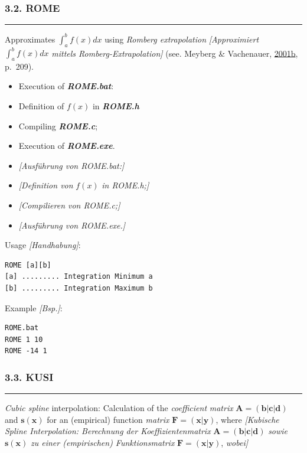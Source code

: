 \documentclass[
]{article}
\begin{document}
\hypertarget{rome}{%
\subsubsection{3.2. ROME}\label{rome}}

\begin{center}\rule{0.5\linewidth}{0.5pt}\end{center}

Approximates \(\int_{a}^{b}f(x)dx\) using \emph{Romberg extrapolation}
\emph{{[}Approximiert} \(\int_{a}^{b}f(x)dx\) \emph{mittels
Romberg-Extrapolation{]}} (see. Meyberg \& Vachenauer,
\href{https://doi.org/10.1007/978-3-642-56654-7_4}{2001b}, p.~209).

\begin{itemize}
\item
  Execution of \textbf{\emph{ROME.bat}}:
\item
  Definition of \(f(x)\) in \textbf{\emph{ROME.h}}
\item
  Compiling \textbf{\emph{ROME.c}};
\item
  Execution of \textbf{\emph{ROME.exe}}.
\item
  \emph{{[}Ausführung von ROME.bat:{]}}
\item
  \emph{{[}Definition von} \(f(x)\) \emph{in ROME.h;{]}}
\item
  \emph{{[}Compilieren von ROME.c;{]}}
\item
  \emph{{[}Ausführung von ROME.exe.{]}}
\end{itemize}

Usage \emph{{[}Handhabung{]}}:

\begin{verbatim}
ROME [a][b]
[a] ......... Integration Minimum a
[b] ......... Integration Maximum b
\end{verbatim}

Example \emph{{[}Bsp.{]}}:

\begin{verbatim}
ROME.bat
ROME 1 10
ROME -14 1
\end{verbatim}

\hypertarget{kusi}{%
\subsubsection{3.3. KUSI}\label{kusi}}

\begin{center}\rule{0.5\linewidth}{0.5pt}\end{center}

\emph{Cubic spline} interpolation: Calculation of the \emph{coefficient}
\emph{matrix}
\(\mathbf{A =}\left( \mathbf{b}\left| \mathbf{c} \right|\mathbf{d} \right)\)
and \(\mathbf{s}\left( \mathbf{x} \right)\) for an (empirical) function
\emph{matrix} \(\mathbf{F =}\left( \mathbf{x|y} \right)\), where
\emph{{[}Kubische Spline Interpolation: Berechnung der
Koeffizientenmatrix}
\(\mathbf{A =}\left( \mathbf{b}\left| \mathbf{c} \right|\mathbf{d} \right)\)
\emph{sowie} \(\mathbf{s}\left( \mathbf{x} \right)\) \emph{zu einer
(empirischen) Funktionsmatrix}
\(\mathbf{F =}\left( \mathbf{x|y} \right)\), \emph{wobei{]}}
\end{document}
